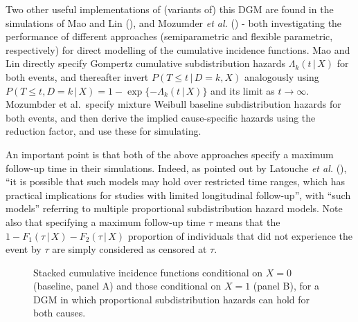 \documentclass[
  letterpaper,
  paper=240mm:170mm,
  twoside=true,
  open=right,
  fontsize=10pt,
  pagesize=false,
  BCOR=15mm,
  DIV=14,
  headinclude=true,
  footinclude=false,
  headsepline=on]{scrbook}
\newcommand{\given}{\,|\,}
\begin{document}
Two other useful implementations of (variants of) this DGM are found in
the simulations of Mao and Lin
(), and
Mozumder \emph{et al.}
() - both
investigating the performance of different approaches (semiparametric
and flexible parametric, respectively) for direct modelling of the
cumulative incidence functions. Mao and Lin directly specify Gompertz
cumulative subdistribution hazards \(\Lambda_k(t \given X)\) for both
events, and thereafter invert \(P(T \leq t \given D=k, X)\) analogously
using \(P(T \leq t, D=k \given X) = 1 - \exp\{-\Lambda_k(t \given X)\}\)
and its limit as \(t \to \infty\). Mozumbder et al.~specify mixture
Weibull baseline subdistribution hazards for both events, and then
derive the implied cause-specific hazards using the reduction factor,
and use these for simulating.

An important point is that both of the above approaches specify a
maximum follow-up time in their simulations. Indeed, as pointed out by
Latouche \emph{et al.}
(), ``it is
possible that such models may hold over restricted time ranges, which
has practical implications for studies with limited longitudinal
follow-up'', with ``such models'' referring to multiple proportional
subdistribution hazard models. Note also that specifying a maximum
follow-up time \(\tau\) means that the
\(1 - F_1(\tau \given X) - F_2(\tau \given X)\) proportion of
individuals that did not experience the event by \(\tau\) are simply
considered as censored at \(\tau\).

\begin{figure}


\caption{\label{fig-twofgs}Stacked cumulative incidence functions
conditional on \(X = 0\) (baseline, panel A) and those conditional on
\(X = 1\) (panel B), for a DGM in which proportional subdistribution
hazards can hold for both causes.}

\end{figure}%
\end{document}
